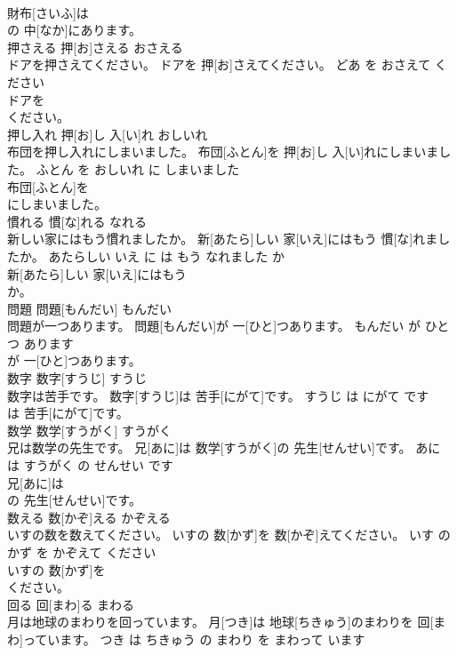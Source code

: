 \documentclass[8pt]{extreport}
\begin{document}
\begin{CJK}{UTF8}{min}
\\	財布[さいふ]は
\\	の 中[なか]にあります。			
\\	押さえる	押[お]さえる	おさえる	
\\	ドアを押さえてください。	ドアを 押[お]さえてください。	どあ を おさえて ください	
\\	ドアを
\\	ください。			
\\	押し入れ	押[お]し 入[い]れ	おしいれ	
\\	布団を押し入れにしまいました。	布団[ふとん]を 押[お]し 入[い]れにしまいました。	ふとん を おしいれ に しまいました	
\\	布団[ふとん]を
\\	にしまいました。			
\\	慣れる	慣[な]れる	なれる	
\\	新しい家にはもう慣れましたか。	新[あたら]しい 家[いえ]にはもう 慣[な]れましたか。	あたらしい いえ に は もう なれました か	
\\	新[あたら]しい 家[いえ]にはもう
\\	か。			
\\	問題	問題[もんだい]	もんだい	
\\	問題が一つあります。	問題[もんだい]が 一[ひと]つあります。	もんだい が ひとつ あります	
\\	が 一[ひと]つあります。			
\\	数字	数字[すうじ]	すうじ	
\\	数字は苦手です。	数字[すうじ]は 苦手[にがて]です。	すうじ は にがて です	
\\	は 苦手[にがて]です。			
\\	数学	数学[すうがく]	すうがく	
\\	兄は数学の先生です。	兄[あに]は 数学[すうがく]の 先生[せんせい]です。	あに は すうがく の せんせい です	
\\	兄[あに]は
\\	の 先生[せんせい]です。			
\\	数える	数[かぞ]える	かぞえる	
\\	いすの数を数えてください。	いすの 数[かず]を 数[かぞ]えてください。	いす の かず を かぞえて ください	
\\	いすの 数[かず]を
\\	ください。			
\\	回る	回[まわ]る	まわる	
\\	月は地球のまわりを回っています。	月[つき]は 地球[ちきゅう]のまわりを 回[まわ]っています。	つき は ちきゅう の まわり を まわって います	

\end{CJK}
\end{document}
